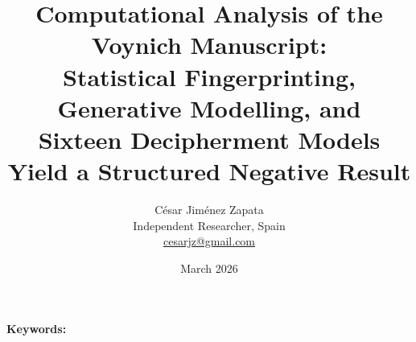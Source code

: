 \documentclass[14pt,a5paper]{extarticle}
\begin{document}
\title{Computational Analysis of the Voynich Manuscript:\\ Statistical Fingerprinting, Generative Modelling, and\\ Sixteen Decipherment Models Yield a Structured Negative Result}

\author{C\'esar Jim\'enez Zapata\\
\small Independent Researcher, Spain\\
\small \href{mailto:cesarjz@gmail.com}{cesarjz@gmail.com}}

\date{March 2026}

\maketitle

\begin{abstract}

\end{abstract}

\noindent\textbf{Keywords:} 





\end{document}
